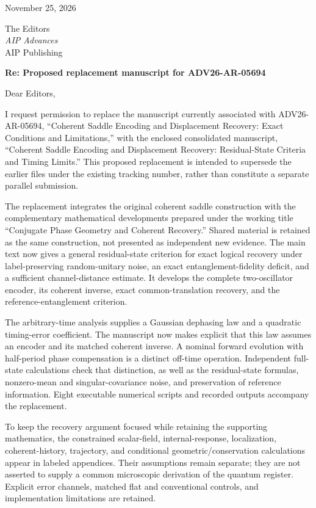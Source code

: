 \documentclass[11pt,letterpaper]{article}
\begin{document}
November 25, 2026

The Editors\\\textit{AIP Advances}\\AIP Publishing

\textbf{Re: Proposed replacement manuscript for ADV26-AR-05694}

Dear Editors,

I request permission to replace the manuscript currently associated with ADV26-AR-05694, ``Coherent Saddle Encoding and Displacement Recovery: Exact Conditions and Limitations,'' with the enclosed consolidated manuscript, ``Coherent Saddle Encoding and Displacement Recovery: Residual-State Criteria and Timing Limits.'' This proposed replacement is intended to supersede the earlier files under the existing tracking number, rather than constitute a separate parallel submission.

The replacement integrates the original coherent saddle construction with the complementary mathematical developments prepared under the working title ``Conjugate Phase Geometry and Coherent Recovery.'' Shared material is retained as the same construction, not presented as independent new evidence. The main text now gives a general residual-state criterion for exact logical recovery under label-preserving random-unitary noise, an exact entanglement-fidelity deficit, and a sufficient channel-distance estimate. It develops the complete two-oscillator encoder, its coherent inverse, exact common-translation recovery, and the reference-entanglement criterion.

The arbitrary-time analysis supplies a Gaussian dephasing law and a quadratic timing-error coefficient. The manuscript now makes explicit that this law assumes an encoder and its matched coherent inverse. A nominal forward evolution with half-period phase compensation is a distinct off-time operation. Independent full-state calculations check that distinction, as well as the residual-state formulas, nonzero-mean and singular-covariance noise, and preservation of reference information. Eight executable numerical scripts and recorded outputs accompany the replacement.

To keep the recovery argument focused while retaining the supporting mathematics, the constrained scalar-field, internal-response, localization, coherent-history, trajectory, and conditional geometric/conservation calculations appear in labeled appendices. Their assumptions remain separate; they are not asserted to supply a common microscopic derivation of the quantum register. Explicit error channels, matched flat and conventional controls, and implementation limitations are retained.
\end{document}
